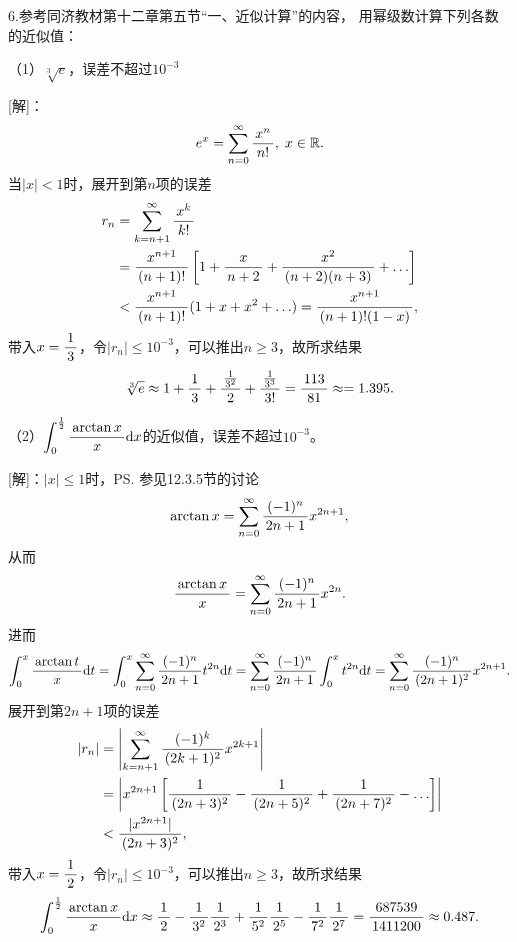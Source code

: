 \bs

6.参考{\kaishu 同济教材第十二章第五节“一、近似计算”}的内容，
用幂级数计算下列各数的近似值：

（1）$\sqrt[3]e$，误差不超过$10^{-3}$

[解]：
$$e^x=\sumn[0]\df{x^n}{n!},\;x\in\mbb{R}.$$
当$|x|<1$时，展开到第$n$项的误差
\begin{align*}
	r_n&=\sum\limits_{k=n+1}^{\infty}\df{x^k}{k!}\\
	&=\df{x^{n+1}}{(n+1)!}\left[1+\df{x}{n+2}+\df{x^2}{(n+2)(n+3)}+\ldots\right]\\
	&<\df{x^{n+1}}{(n+1)!}(1+x+x^2+\ldots)=\df{x^{n+1}}{(n+1)!(1-x)},
\end{align*}
带入$x=\df13$，令$|r_n|\leq 10^{-3}$，可以推出$n\geq 3$，故所求结果
$$
\sqrt[3]e\approx1+\df13+\df{\frac1{3^2}}2+\df{\frac1{3^3}}{3!}
=\df{113}{81}\approx=1.395.
$$

（2）$\dint_0^{\frac12}\df{\arctan x}x\d x$的近似值，误差不超过$10^{-3}$。

[解]：$|x|\leq 1$时，\ps{参见12.3.5节的讨论}
$$\arctan x=\sumn[0]\df{(-1)^n}{2n+1}x^{2n+1},$$
从而
$$\df{\arctan x}x=\sumn[0]\df{(-1)^n}{2n+1}x^{2n}.$$
进而
$$\dint_0^x\df{\arctan t}x\d t
=\dint_0^x\sumn[0]\df{(-1)^n}{2n+1}t^{2n}\d t
=\sumn[0]\df{(-1)^n}{2n+1}\dint_0^xt^{2n}\d t
=\sumn[0]\df{(-1)^n}{(2n+1)^2}x^{2n+1}.$$
展开到第$2n+1$项的误差
\begin{align*}
	|r_n|
	&=\left|\sum\limits_{k=n+1}^{\infty}
	\df{(-1)^k}{(2k+1)^2}x^{2k+1}\right|\\
	&=\left|x^{2n+1}\left[\df1{(2n+3)^2}
	-\df1{(2n+5)^2}+\df1{(2n+7)^2}-\ldots\right]\right|\\
	&<\df{|x^{2n+1}|}{(2n+3)^2},
\end{align*}
带入$x=\df12$，令$|r_n|\leq 10^{-3}$，可以推出$n\geq 3$，故所求结果
$$\dint_0^{\frac12}\df{\arctan x}x\d x
\approx \df12-\df1{3^2}\df1{2^3}+\df1{5^2}\df1{2^5}-\df1{7^2}\df1{2^7}
=\df{687539}{1411200}\approx 0.487.$$
\fin 
